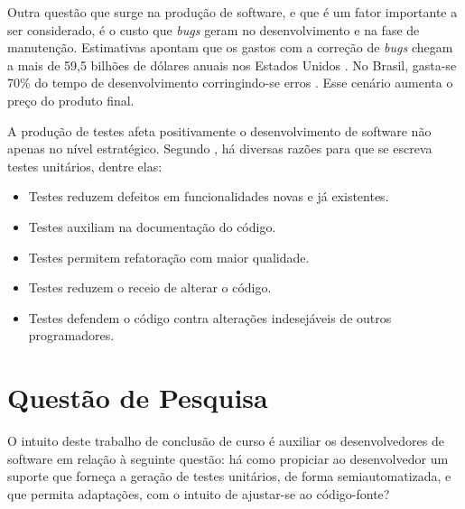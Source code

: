   \par
  \indent Outra questão que surge na produção de software, e que é um fator importante a ser considerado, é o custo que \textit{bugs} geram no desenvolvimento e na fase de manutenção. Estimativas apontam que os gastos com a correção de \textit{bugs} chegam a mais de 59,5 bilhões de dólares anuais nos Estados Unidos \cite{jantti2008}. No Brasil, gasta-se 70\% do tempo de desenvolvimento corringindo-se erros \cite{janones2010}. Esse cenário aumenta o preço do produto final.
  \par
  \indent A produção de testes afeta positivamente o desenvolvimento de software não apenas no nível estratégico. Segundo , há diversas razões para que se escreva testes unitários, dentre elas:
  \begin{itemize}
    \item Testes reduzem defeitos em funcionalidades novas e já existentes.
    \item Testes auxiliam na documentação do código.
    \item Testes permitem refatoração com maior qualidade.
    \item Testes reduzem o receio de alterar o código.
    \item Testes defendem o código contra alterações indesejáveis de outros programadores.
  \end{itemize}

 \section{Questão de Pesquisa}
O intuito deste trabalho de conclusão de curso é auxiliar os desenvolvedores de software em relação à seguinte questão: há como propiciar ao desenvolvedor um suporte que forneça a geração de testes unitários, de forma semiautomatizada, e que permita adaptações, com o intuito de ajustar-se ao código-fonte?

